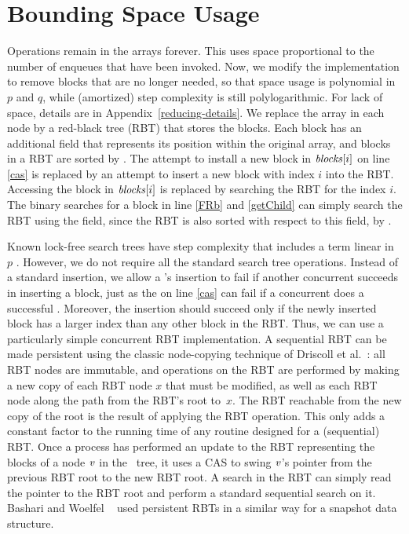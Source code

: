 
\section{Bounding Space Usage}
\label{reducing}

Operations remain in the  arrays forever. 
This uses space proportional to the number of enqueues that have been invoked.
Now, we modify the implementation to remove blocks that are no longer needed, so that space usage is
polynomial in $p$ and $q$, while (amortized) step complexity is still polylogarithmic.  For lack of space, details are in Appendix~\ref{reducing-details}.
We replace the  array in each node by a red-black tree (RBT)
that stores the blocks.
Each block has an additional  field
that represents its position within the original  array, and
blocks in a RBT are sorted by .
The attempt to install a new block in $\mbox{\textit{blocks}}[i]$  on line \ref{cas}
is replaced by an attempt to insert a new block with index $i$ into the RBT.
Accessing the block in $\mbox{\textit{blocks}}[i]$ is 
replaced by searching the RBT for the  index $i$.
The binary searches for a block in line \ref{FRb} and \ref{getChild} can simply search the RBT
using the  field, since the RBT is also sorted with respect to this field, by .
 
Known lock-free search trees have step complexity that includes a term linear in $p$ \cite{EFHR14,Ko20}.  
However, we do not require all the standard search tree operations.
Instead of a standard insertion, we allow a 's insertion to fail if another
concurrent  succeeds in inserting a block, just as the  on line \ref{cas}
can fail if a concurrent  does a successful .
Moreover, the insertion should succeed only if the newly inserted block has a larger index than any other block in the RBT.
Thus, we can use a particularly simple concurrent RBT implementation.
A sequential RBT can be made persistent using the classic node-copying technique of 
Driscoll et al.~\cite{DSST89}:  all RBT nodes are immutable, and operations on the 
RBT are performed by making a new copy of each RBT node $x$ that must be modified, as well
as each RBT node along the path from the RBT's root to~$x$.
The RBT reachable from the new copy of the root is the result of applying the RBT operation.
This only adds a constant factor to the running time of any routine designed for a (sequential) RBT.
Once a process has performed an update to the RBT representing the blocks of a node 
$\mbox{\textnormal{\textit{v}}}$ in the \ordering\ tree, 
it uses a CAS to swing $\mbox{\textnormal{\textit{v}}}$'s pointer from the previous RBT root to the new RBT root.
A search in the RBT can simply read the pointer to the RBT root and perform a standard
sequential search on it.
Bashari and Woelfel ~\cite{DBLP:conf/podc/BashariW21} used persistent RBTs in a similar way for a snapshot data structure.

